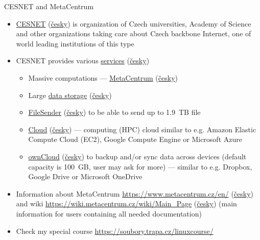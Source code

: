 \documentclass[compress, ucs, xelatex, 11pt, xcolor=svgnames, aspectratio=169,
	hyperref={
		bookmarks=true,
		unicode=true,
		colorlinks=true,
		pdftitle={Molecular data in R},
		plainpages=false,
		pdfauthor={Vojtech Zeisek},
		pdfsubject={Course about phylogeny and evolution in R},
		pdfcreator={XeLaTeX},
		pdfkeywords={R, evolution, phylogeny, molecular data},
		linkcolor=Crimson, %
		anchorcolor=Magenta, %
		citecolor=Magenta, %
		filecolor=Magenta, %
		menucolor=Magenta, %
		urlcolor=DodgerBlue, %
		pdftex},
	url={hyphens, lowtilde} %
	]{beamer}
\begin{document}
\begin{frame}{CESNET and MetaCentrum}
	\begin{itemize}
		\item \href{https://www.cesnet.cz/?lang=en}{CESNET} (\href{https://www.cesnet.cz/}{česky}) is organization of Czech universities, Academy of Science and other organizations taking care about Czech backbone Internet, one of world leading institutions of this type
		\item CESNET provides various \href{https://www.cesnet.cz/services/?lang=en}{services} (\href{https://www.cesnet.cz/sluzby/}{česky})
		\begin{itemize}
			\item Massive computations --- \href{https://www.cesnet.cz/services/massive-computations-metacentrum/?lang=en}{MetaCentrum} (\href{https://www.cesnet.cz/sluzby/metacentrum/}{česky})
			\item Large \href{https://www.cesnet.cz/services/data-storage/?lang=en}{data storage} (\href{https://www.cesnet.cz/sluzby/datova-uloziste/}{česky})
			\item \href{https://www.cesnet.cz/services/filesender/?lang=en}{FileSender} (\href{https://www.cesnet.cz/sluzby/filesender/}{česky}) to be able to send up to 1.9~TB file
			\item \href{https://www.metacentrum.cz/en/Sluzby/Cloud/}{Cloud} (\href{https://www.metacentrum.cz/cs/Sluzby/Cloud/}{česky}) --- computing (HPC) cloud similar to e.g. Amazon Elastic Compute Cloud (EC2), Google Compute Engine or Microsoft Azure
			\item \href{https://www.cesnet.cz/services/owncloud/?lang=en}{ownCloud} (\href{https://www.cesnet.cz/sluzby/owncloud/}{česky}) to backup and/or sync data across devices (default capacity is 100~GB, user may ask for more) --- similar to e.g. Dropbox, Google Drive or Microsoft OneDrive
		\end{itemize}
		\item Information about MetaCentrum \url{https://www.metacentrum.cz/en/} (\href{https://www.metacentrum.cz/cs/}{česky}) and wiki \url{https://wiki.metacentrum.cz/wiki/Main_Page} (\href{https://wiki.metacentrum.cz/wiki/Hlavn\%C3\%AD_strana}{česky}) (main information for users containing all needed documentation)
		\item Check my special course \url{https://soubory.trapa.cz/linuxcourse/}
	\end{itemize}
\end{frame}
\end{document}
